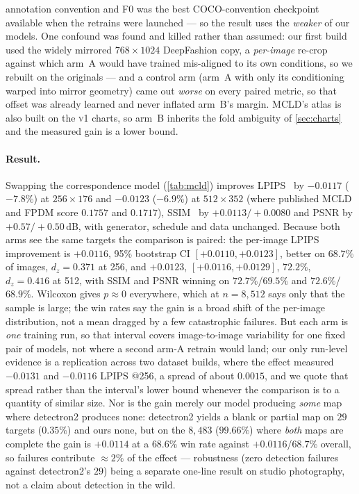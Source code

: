 annotation convention and F0 was the best COCO-convention checkpoint available when the retrains
were launched --- so the result uses the \emph{weaker} of our models. One confound was found and
killed rather than assumed: our first build used the widely mirrored $768\!\times\!1024$
DeepFashion copy, a \emph{per-image} re-crop against which arm~A would have trained mis-aligned to
its own conditions, so we rebuilt on the originals --- and a control arm (arm~A with only its
conditioning warped into mirror geometry) came out \emph{worse} on every paired metric, so that
offset was already learned and never inflated arm~B's margin. MCLD's atlas is also built on the
\textsc{v1} charts, so arm~B inherits the fold ambiguity of \cref{sec:charts} and the measured gain
is a lower bound.

\paragraph{Result.}
Swapping the correspondence model (\cref{tab:mcld}) improves LPIPS~\cite{zhang2018lpips} by
$-0.0117$ ($-7.8\%$) at $256\!\times\!176$ and $-0.0123$ ($-6.9\%$) at $512\!\times\!352$ (where
published MCLD and FPDM score $0.1757$ and $0.1717$),
SSIM~\cite{wang2004ssim} by $+0.0113/{+}0.0080$ and PSNR by $+0.57/{+}0.50$\,dB, with generator,
schedule and data unchanged. Because both arms see the same targets the comparison is paired: the
per-image LPIPS improvement is $+0.0116$, 95\% bootstrap CI $[+0.0110,+0.0123]$, better on $68.7\%$
of images, $d_z=0.371$ at 256, and $+0.0123$, $[+0.0116,+0.0129]$, $72.2\%$, $d_z=0.416$ at 512,
with SSIM and PSNR winning on $72.7\%$/$69.5\%$ and $72.6\%$/$68.9\%$. Wilcoxon gives $p\approx0$
everywhere, which at $n=8{,}512$ says only that the sample is large; the win rates say the gain is
a broad shift of the per-image distribution, not a mean dragged by a few catastrophic failures. But
each arm is \emph{one} training run, so that interval covers image-to-image variability for one
fixed pair of models, not where a second arm-A retrain would land; our only run-level evidence is a
replication across two dataset builds, where the effect measured $-0.0131$ and $-0.0116$ LPIPS
@256, a spread of about $0.0015$, and we quote that spread rather than the interval's lower bound
whenever the comparison is to a quantity of similar size. Nor is the gain merely our model
producing \emph{some} map where detectron2 produces none: detectron2 yields a blank or partial map
on $29$ targets ($0.35\%$) and ours none, but on the $8{,}483$ ($99.66\%$) where \emph{both} maps
are complete the gain is $+0.0114$ at a $68.6\%$ win rate against $+0.0116$/$68.7\%$ overall, so
failures contribute ${\approx}2\%$ of the effect --- robustness (zero detection failures against
detectron2's $29$) being a separate one-line result on studio photography, not a claim about
detection in the wild.

